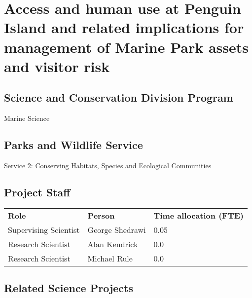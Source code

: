 \documentclass[version=last,
    paper=a4,                               %
    10pt,                                   %
    dvipsnames,
    oneside,                              %
    headings=openany,                       %
    open=any,
    BCOR=7mm,                               %
    DIV=15,     %
]{scrbook}
\begin{document}
\frontmatter
\maketitle
\mainmatter



\section*{Access and human use at Penguin Island and related implications for
management of Marine Park assets and visitor risk
}



\subsection*{Science and Conservation Division Program}

Marine Science




\subsection*{Parks and Wildlife Service}

Service 2: Conserving Habitats, Species and Ecological Communities


\subsection*{Project Staff}
\begin{tabu} {X X X}
\textbf{Role} & \textbf{Person} & \textbf{Time allocation (FTE)}\\

Supervising Scientist & George Shedrawi & 0.05\\

Research Scientist & Alan Kendrick & 0.0\\

Research Scientist & Michael Rule & 0.0\\

\end{tabu}




\subsection*{Related Science Projects}
\end{document}
